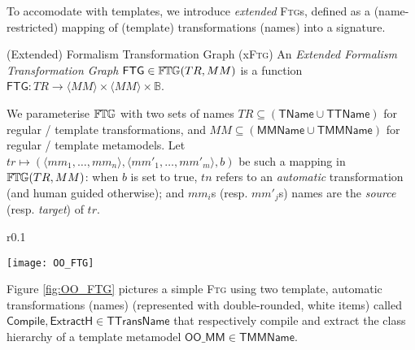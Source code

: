 To accomodate with templates, we introduce \emph{extended} \textsc{Ftg}s, 
defined as a (name-restricted) mapping of (template) transformations (names) 
into a signature.

\begin{Definition}{(Extended) Formalism Transformation Graph (x\textsc{Ftg})}
An \emph{Extended Formalism Transformation Graph} $\mathsf{FTG} \in \mathbb{F}\mskip-1mu\mathbb{T}\mskip-1mu\mathbb{G}(TR, 
MM)$ is a function  $\mathsf{FTG} \colon TR \to \langle MM \rangle \times 
\langle MM \rangle \times \mathbb{B}$.
\end{Definition}
\noindent
We parameterise $\mathbb{F}\mskip-1mu\mathbb{T}\mskip-1mu\mathbb{G}$ with two sets of names $TR\subseteq (\mathsf{TName}\cup 
\mathsf{TTName})$ for regular / template transformations, and $MM\subseteq 
(\mathsf{MMName} \cup \mathsf{TMMName})$ for regular / template metamodels. 
Let $tr \mapsto (\langle mm_1, \ldots, mm_n \rangle, \langle mm'_1, \ldots, 
mm'_m \rangle, b)$ be such a mapping in $\mathbb{F}\mskip-1mu\mathbb{T}\mskip-1mu\mathbb{G}(TR, MM)$: when $b$ is
set to true, $tn$ refers to an \emph{automatic} transformation (and human 
guided otherwise); and $mm_i$s (resp. $mm'_j$s) names are the \emph{source} 
(resp. \emph{target}) of $tr$.
%
%
\begin{wrapfigure}[10]{r}{0.1\textwidth}
  \begin{center}
    \texttt{[image: OO\_FTG]}
  \end{center}
  \caption{Simple \textsc{Ftg}: compilation and hierarchy extraction.}
  \label{fig:OO_FTG}
\end{wrapfigure}
Figure \ref{fig:OO_FTG} pictures a simple \textsc{Ftg} using two template, 
automatic transformations (names) (represented with double-rounded, white 
items) called $\mathsf{Compile}, \mathsf{ExtractH}\in 
\mathsf{TTransName}$ that respectively compile and extract the class hierarchy 
of a template metamodel $\mathsf{OO\_MM}\in\mathsf{TMMName}$. 

